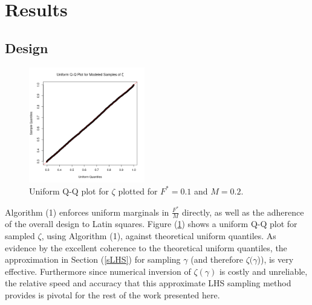 %
\clearpage
\section{Results}

%
\subsection{Design}

%
\begin{figure}
\vspace{-1.5cm}
\includegraphics[width=0.45\textwidth]{../gpBias/qqUnif.png}
\vspace{-1cm} %
\caption{Uniform Q-Q plot for $\zeta$ plotted for $F^*=0.1$ and $M=0.2$.}
\label{qqZeta}
\end{figure}

%
Algorithm (1) enforces uniform marginals in $\frac{F^*}{M}$ directly, as well
as the adherence of the overall design to Latin squares.
Figure (\ref{qqZeta}) shows a uniform Q-Q plot for sampled $\zeta$, using
Algorithm (1), against theoretical uniform quantiles. As evidence by the
excellent coherence to the theoretical uniform quantiles, the approximation
in Section (\ref{sLHS}) for sampling $\gamma$ (and therefore $\zeta(\gamma$)),
is very effective.
Furthermore since numerical inversion of $\zeta(\gamma)$ is costly and
unreliable, the relative speed and accuracy that this approximate LHS sampling
method provides is pivotal for the rest of the work presented here. %

